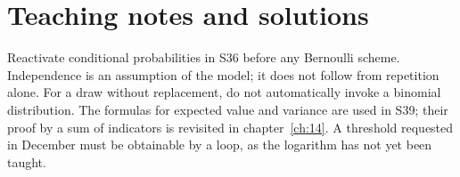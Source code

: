 \ifmxteacher\mxnewpage\section{Teaching notes and solutions}\begin{teachernote}Reactivate conditional probabilities in S36 before any Bernoulli scheme. Independence is an assumption of the model; it does not follow from repetition alone. For a draw without replacement, do not automatically invoke a binomial distribution. The formulas for expected value and variance are used in S39; their proof by a sum of indicators is revisited in chapter~\ref{ch:14}. A threshold requested in December must be obtainable by a loop, as the logarithm has not yet been taught.\end{teachernote}

